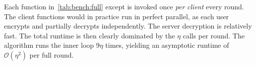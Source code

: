 Each function in~\cref{tab:bench:full} except  is invoked once \emph{per client} every round. The client functions would in practice run in perfect parallel, as each user encrypts and partially decrypts independently. The server decryption is relatively fast. The total runtime is then clearly dominated by the $\eta$ \serverWrite{} calls per round. The algorithm runs the inner loop $9\eta$ times, yielding an asymptotic runtime of $\mathcal{O}(\eta^2)$ per full round. 